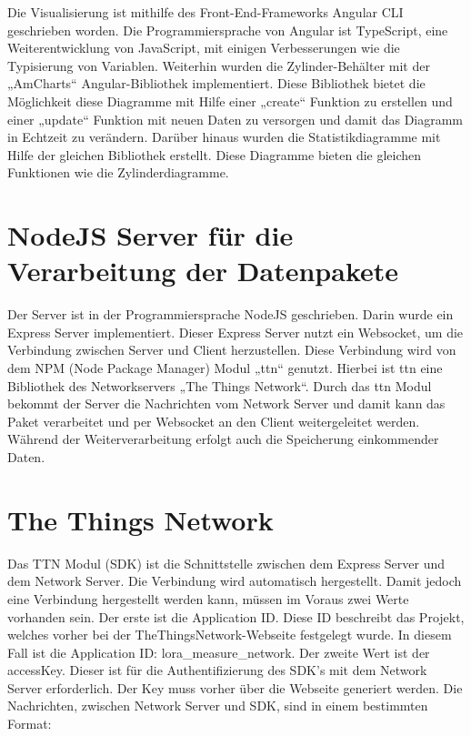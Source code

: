 \noindent
Die Visualisierung ist mithilfe des Front-End-Frameworks Angular CLI geschrieben worden. Die Programmiersprache von Angular ist TypeScript, eine Weiterentwicklung von JavaScript, mit einigen Verbesserungen wie die Typisierung von Variablen. Weiterhin wurden die Zylinder-Behälter mit der „AmCharts“ Angular-Bibliothek implementiert. Diese Bibliothek bietet die Möglichkeit diese Diagramme mit Hilfe einer „create“ Funktion zu erstellen und einer „update“ Funktion mit neuen Daten zu versorgen und damit das Diagramm in Echtzeit zu verändern. Darüber hinaus wurden die Statistikdiagramme mit Hilfe der gleichen Bibliothek erstellt. Diese Diagramme bieten die gleichen Funktionen wie die Zylinderdiagramme.

\section{NodeJS Server für die Verarbeitung der Datenpakete}
Der Server ist in der Programmiersprache NodeJS geschrieben. Darin wurde ein Express Server implementiert. Dieser Express Server nutzt ein Websocket, um die Verbindung zwischen Server und Client herzustellen. Diese Verbindung wird von dem NPM (Node Package Manager) Modul „ttn“ genutzt. Hierbei ist ttn eine Bibliothek des Networkservers „The Things Network“. Durch das ttn Modul bekommt der Server die Nachrichten vom Network Server und damit kann das Paket verarbeitet und per Websocket an den Client weitergeleitet werden. Während der Weiterverarbeitung erfolgt auch die Speicherung einkommender Daten.

\section{The Things Network}
Das TTN Modul (SDK) ist die Schnittstelle zwischen dem Express Server und dem Network Server. Die Verbindung wird automatisch hergestellt. Damit jedoch eine Verbindung hergestellt werden kann, müssen im Voraus zwei Werte vorhanden sein. Der erste ist die Application ID. Diese ID beschreibt das Projekt, welches vorher bei der TheThingsNetwork-Webseite festgelegt wurde. In diesem Fall ist die Application ID: lora\_measure\_network. Der zweite Wert ist der accessKey. Dieser ist für die Authentifizierung des SDK’s mit dem Network Server erforderlich. Der Key muss vorher über die Webseite generiert werden. Die Nachrichten, zwischen Network Server und SDK, sind in einem bestimmten Format:\\


